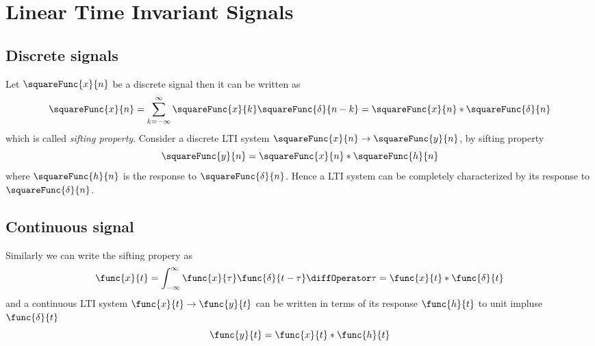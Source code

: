 \chapter{Linear Time Invariant Signals}
\section{Discrete signals}
Let \(\squareFunc{x}{n}\) be a discrete signal then it can be written as
\begin{equation*}
    \squareFunc{x}{n} = \sum_{k = -\infty}^{\infty} \squareFunc{x}{k} \squareFunc{\delta}{n -k} = \squareFunc{x}{n} \ast \squareFunc{\delta}{n}
\end{equation*}
which is called \textit{sifting property}. Consider a discrete LTI system \(\squareFunc{x}{n} \to \squareFunc{y}{n}\), by sifting property
\begin{equation*}
    \squareFunc{y}{n} = \squareFunc{x}{n} \ast \squareFunc{h}{n}
\end{equation*}
where \(\squareFunc{h}{n}\) is the response to \(\squareFunc{\delta}{n}\). Hence a LTI system can be completely characterized by its response to \(\squareFunc{\delta}{n}\).

\section{Continuous signal}
Similarly we can write the sifting propery as 
\begin{equation*}
    \func{x}{t} = \int_{-\infty}^{\infty} \func{x}{\tau} \func{\delta}{t - \tau} \diffOperator \tau = \func{x}{t} \ast \func{\delta}{t}
\end{equation*}
and a continuous LTI system \(\func{x}{t} \to \func{y}{t}\) can be written in terms of its response \(\func{h}{t}\) to unit impluse \(\func{\delta}{t}\)
\begin{equation*}
    \func{y}{t} = \func{x}{t} \ast \func{h}{t}
\end{equation*}